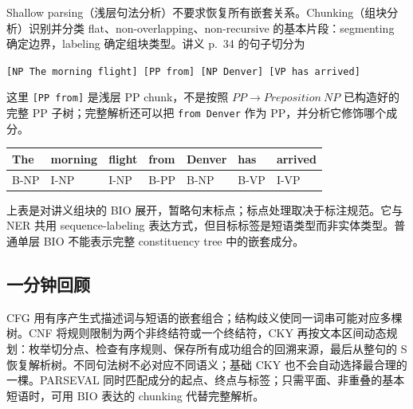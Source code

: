Shallow parsing（浅层句法分析）不要求恢复所有嵌套关系。Chunking（组块分析）识别并分类 flat、non-overlapping、non-recursive 的基本片段：segmenting 确定边界，labeling 确定组块类型。讲义 p.~34 的句子切分为
\begin{center}
  \texttt{[NP The morning flight] [PP from] [NP Denver] [VP has arrived]}
\end{center}
这里 \texttt{[PP from]} 是浅层 PP chunk，不是按照 $PP\rightarrow Preposition\ NP$ 已构造好的完整 PP 子树；完整解析还可以把 \texttt{from Denver} 作为 PP，并分析它修饰哪个成分。

\begin{center}
\small
\begin{tabular}{@{}lllllll@{}}
  \toprule
  The & morning & flight & from & Denver & has & arrived \\
  \midrule
  B-NP & I-NP & I-NP & B-PP & B-NP & B-VP & I-VP \\
  \bottomrule
\end{tabular}
\end{center}
上表是对讲义组块的 BIO 展开，暂略句末标点；标点处理取决于标注规范。它与 NER 共用 sequence-labeling 表达方式，但目标标签是短语类型而非实体类型。普通单层 BIO 不能表示完整 constituency tree 中的嵌套成分。

\subsection{一分钟回顾}

CFG 用有序产生式描述词与短语的嵌套组合；结构歧义使同一词串可能对应多棵树。CNF 将规则限制为两个非终结符或一个终结符，CKY 再按文本区间动态规划：枚举切分点、检查有序规则、保存所有成功组合的回溯来源，最后从整句的 S 恢复解析树。不同句法树不必对应不同语义；基础 CKY 也不会自动选择最合理的一棵。PARSEVAL 同时匹配成分的起点、终点与标签；只需平面、非重叠的基本短语时，可用 BIO 表达的 chunking 代替完整解析。
